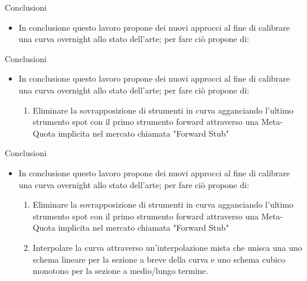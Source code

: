 \begin{tframe}{Conclusioni}
\begin{itemize}
\item In conclusione questo lavoro propone dei nuovi approcci al fine di calibrare una curva overnight allo stato dell'arte; per fare ciò propone di:
\end{itemize}
\end{tframe}
\begin{tframe}{Conclusioni}
\begin{itemize}
\item In conclusione questo lavoro propone dei nuovi approcci al fine di calibrare una curva overnight allo stato dell'arte; per fare ciò propone di:
     \begin{enumerate}
         \item Eliminare la sovrapposizione di strumenti in curva agganciando l'ultimo strumento spot con il primo strumento forward attraverso una Meta-Quota implicita nel mercato chiamata "Forward Stub"
     \end{enumerate}
\end{itemize}
\end{tframe}
\begin{tframe}{Conclusioni}
\begin{itemize}
\item In conclusione questo lavoro propone dei nuovi approcci al fine di calibrare una curva overnight allo stato dell'arte; per fare ciò propone di:
     \begin{enumerate}
         \item Eliminare la sovrapposizione di strumenti in curva agganciando l'ultimo strumento spot con il primo strumento forward attraverso una Meta-Quota implicita nel mercato chiamata "Forward Stub"
         \item Interpolare la curva attraverso un'interpolazione mista che unisca una uno schema lineare per la sezione a breve della curva e uno schema cubico monotono per la sezione a medio/lungo termine.
     \end{enumerate}
\end{itemize}
\end{tframe}
